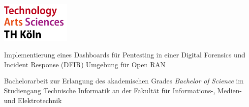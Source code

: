 \begin{titlepage}
    \begin{center}
        \begin{minipage}[c]{0.33\textwidth}
            \includegraphics[height=2cm]{images/th_koeln.png} %
        \end{minipage}%
        \hfill
        \begin{minipage}[c]{0.1\textwidth}
        \end{minipage}%
        \hfill
        \begin{minipage}[c]{0.49\textwidth}
        \end{minipage}
    \end{center}
    \vfill
    \begin{center}
        \huge Implementierung eines Dashboards für Pentesting in einer Digital Forensics und Incident Response (DFIR) Umgebung für Open RAN\\[10mm]
    \end{center}
    Bachelorarbeit zur Erlangung des akademischen Grades\newline
    \emph{Bachelor of Science}\newline
    im Studiengang Technische Informatik\newline
    an der Fakultät für Informations-, Medien- und Elektrotechnik\newline

\end{titlepage}
